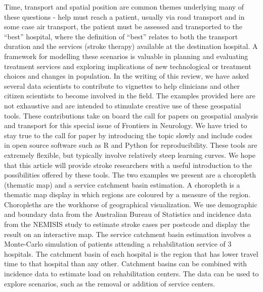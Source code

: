 \documentclass[utf8]{frontiersHLTH}
\begin{document}
Time, transport and spatial position are common themes underlying many
of these questions - help must reach a patient, usually via road
transport and in some case air transport, the patient must be assessed
and transported to the ``best'' hospital, where the definition of
``best'' relates to both the transport duration and the services
(stroke therapy) available at the destination hospital. A framework
for modelling these scenarios is valuable in planning and evaluating
treatment services and exploring implications of new technological or
treatment choices and changes in population. In the writing of this
review, we have asked several data scientists to contribute to
vignettes to help clinicians and other citizen scientists to become
involved in the field. The examples provided here are not exhaustive
and are intended to stimulate creative use of these geospatial
tools. These contributions take on board the call for papers on
geospatial analysis and transport for this special issue of Frontiers
in Neurology. We have tried to stay true to the call for paper by
introducing the topic slowly and include codes in open source software
such as R and Python for reproducibility. These tools are extremely
flexible, but typically involve relatively steep learning curves. We
hope that this article will provide stroke researchers with a useful
introduction to the possibilities offered by these tools. The two
examples we present are a choropleth (thematic map) and a service
catchment basin estimation. A choropleth is a thematic map display in
which regions are coloured by a measure of the region. Choropleths are
the workhorse of geographical visualization. We use demographic and
boundary data from the Australian Bureau of Statistics and incidence
data from the NEMISIS
\cite{thrift_stroke_2000,azarpazhooh2008patterns} study to estimate
stroke cases per postcode and display the result on an interactive
map. The service catchment basin estimation involves a Monte-Carlo
simulation of patients attending a rehabilitation service of 3
hospitals. The catchment basin of each hospital is the region that has
lower travel time to that hospital than any other.  Catchment basins
can be combined with incidence data to estimate load on rehabilitation
centers. The data can be used to explore scenarios, such as the
removal or addition of service centers.

\end{document}
